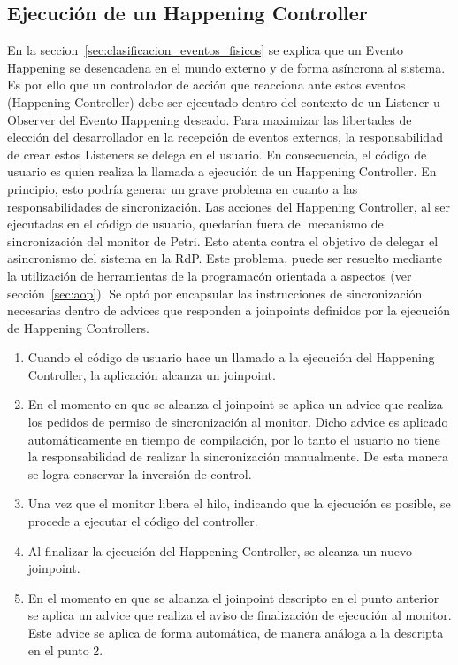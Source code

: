 \newpage

\subsection{Ejecución de un Happening Controller}
\label{sec:ejecucion_happening_controller}
En la seccion~\ref{sec:clasificacion_eventos_fisicos} se explica que un Evento
Happening se desencadena en el mundo externo y de forma asíncrona al sistema. Es
por ello que un controlador de acción que reacciona ante estos
eventos (Happening Controller) debe ser ejecutado dentro del contexto de un
Listener u Observer del Evento Happening deseado.
Para maximizar las libertades de elección del desarrollador en la recepción de
eventos externos, la responsabilidad de crear estos Listeners se delega en el
usuario. En consecuencia, el código de usuario es quien realiza la llamada a
ejecución de un Happening Controller.
En principio, esto podría generar un grave problema en cuanto a las
responsabilidades de sincronización.
Las acciones del Happening Controller, al ser ejecutadas en el código de
usuario, quedarían fuera del mecanismo de sincronización del monitor de Petri.
Esto atenta contra el objetivo de delegar el asincronismo del sistema en la RdP.
Este problema, puede ser resuelto mediante la utilización de herramientas de la
programacón orientada a aspectos (ver sección~\ref{sec:aop}). Se optó por
encapsular las instrucciones de sincronización necesarias dentro de advices que responden a
joinpoints definidos por la ejecución de Happening Controllers.
\begin{enumerate}
  \item Cuando el código de usuario hace un llamado a la ejecución del Happening
  Controller, la aplicación alcanza un joinpoint.
  \item En el momento en que se alcanza el joinpoint se aplica un advice que
  realiza los pedidos de permiso de sincronización al monitor. Dicho advice es
  aplicado automáticamente en tiempo de compilación, por lo tanto el usuario no
  tiene la responsabilidad de realizar la sincronización manualmente. De esta
  manera se logra conservar la inversión de control.
  \item Una vez que el monitor libera el hilo, indicando que la ejecución es
  posible, se procede a ejecutar el código del controller.
  \item Al finalizar la ejecución del Happening Controller, se alcanza un nuevo
  joinpoint.
  \item En el momento en que se alcanza el joinpoint descripto en el punto
  anterior se aplica un advice que realiza el aviso de finalización de
  ejecución al monitor. Este advice se aplica de forma automática, de manera
  análoga a la descripta en el punto 2. 
\end{enumerate}

